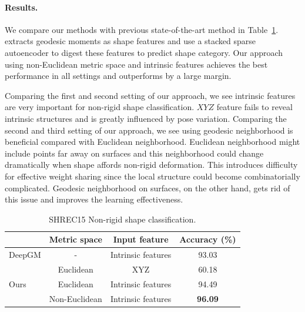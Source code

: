\vspace{-0.3cm}
\paragraph{Results.}  
We compare our methods with previous state-of-the-art method \cite{luciano2017deep} in Table~\ref{tab:nonrigid_classification}. \cite{luciano2017deep} extracts geodesic moments as shape features and use a stacked sparse autoencoder to digest these features to predict shape category.
Our approach using non-Euclidean metric space and intrinsic features achieves the best performance in all settings and outperforms \cite{luciano2017deep} by a large margin.

Comparing the first and second setting of our approach, we see intrinsic features are very important for non-rigid shape classification. %
$XYZ$ feature fails to reveal intrinsic structures and is greatly influenced by pose variation.
Comparing the second and third setting of our approach, we see using geodesic neighborhood is beneficial compared with Euclidean neighborhood. Euclidean neighborhood might include points far away on surfaces and this neighborhood could change dramatically when shape affords non-rigid deformation. This introduces difficulty for effective weight sharing since the local structure could become combinatorially complicated. Geodesic neighborhood on surfaces, on the other hand, gets rid of this issue and improves the learning effectiveness.

\begin{table}[h!]
\centering
\small
\begin{tabular}{lccc}
\toprule
& Metric space & Input feature & Accuracy (\%) \\ \midrule
DeepGM \cite{luciano2017deep} & - & Intrinsic features & 93.03 \\ \midrule
\multirow{3}{*}{Ours} & Euclidean & XYZ & 60.18\\
& Euclidean & Intrinsic features & 94.49\\
& Non-Euclidean & Intrinsic features & \textbf{96.09}\\\bottomrule
\end{tabular}
\caption{SHREC15 Non-rigid shape classification.}
\label{tab:nonrigid_classification}
\vspace{-0.7cm}
\end{table}

